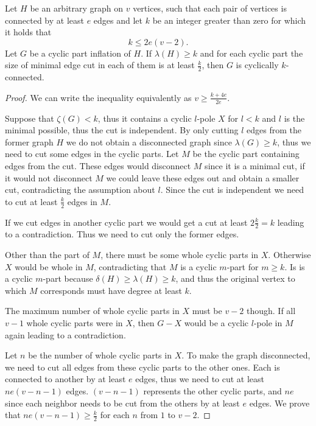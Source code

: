 \documentclass[12pt, twoside]{book}
\begin{document}
\begin{theorem}\label{th:cyclic-part-inflation-kve}
	Let $H$ be an arbitrary graph on $v$ vertices, such that each pair of vertices is connected by at least $e$ edges and let $k$ be an integer greater than zero for which it holds that
	$$k\leq 2e(v-2).$$
	Let $G$ be a cyclic part inflation of $H$. If $\lambda(H)\geq k$ and for each cyclic part the size of minimal edge cut in each of them is at least $\frac{k}{2}$, then $G$ is cyclically $k$-connected.
\end{theorem}

\begin{proof}
	
	We can write the inequality equivalently as $v\geq \frac{k+4e}{2e}$.
	
	Suppose that $\zeta(G)<k$, thus it contains a cyclic $l$-pole $X$ for $l<k$ and $l$ is the minimal possible, thus the cut is independent. By only cutting $l$ edges from the former graph $H$ we do not obtain a disconnected graph since $\lambda(G)\geq k$, thus we need to cut some edges in the cyclic parts. Let $M$ be the cyclic part containing edges from the cut. These edges would disconnect $M$ since it is a minimal cut, if it would not disconnect $M$ we could leave these edges out and obtain a smaller cut, contradicting the assumption about $l$. Since the cut is independent we need to cut at least $\frac{k}{2}$ edges in $M$.
	
	If we cut edges in another cyclic part we would get a cut at least $2\frac{k}{2}=k$ leading to a contradiction. Thus we need to cut only the former edges.
	
	Other than the part of $M$, there must be some whole cyclic parts in $X$. Otherwise $X$ would be whole in $M$, contradicting that $M$ is a cyclic $m$-part for $m\geq k$. Is is a cyclic $m$-part because $\delta(H)\geq \lambda(H)\geq k$, and thus the original vertex to which $M$ corresponds must have degree at least $k$.
	
	The maximum number of whole cyclic parts in $X$ must be $v-2$ though. If all $v-1$ whole cyclic parts were in $X$, then $G-X$ would be a cyclic $l$-pole in $M$ again leading to a contradiction.
	
	Let $n$ be the number of whole cyclic parts in $X$. To make the graph disconnected, we need to cut all edges from these cyclic parts to the other ones. Each is connected to another by at least $e$ edges, thus we need to cut at least $ne(v-n-1)$ edges. $(v-n-1)$ represents the other cyclic parts, and $ne$ since each neighbor needs to be cut from the others by at least $e$ edges. We prove that $ne(v-n-1)\geq\frac{k}{2}$ for each $n$ from $1$ to $v-2$.
	

\end{proof}
\end{document}
